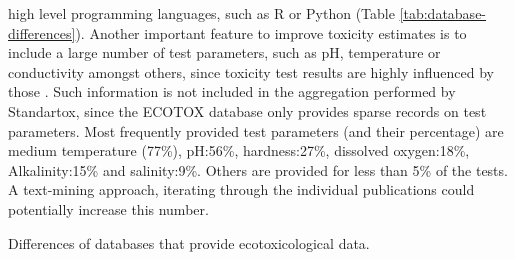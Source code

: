 high level programming languages, such as R or Python \citep{pythoncoreteam_python_2020} (Table \ref{tab:database-differences}). Another important feature to improve toxicity estimates is to include a large number of test parameters, such as pH, temperature or conductivity amongst others, since toxicity test results are highly influenced by those \citep{rosenkrantz_influence_2013, li_temperature_2011}. Such information is not included in the aggregation performed by Standartox, since the ECOTOX database only provides sparse records on test parameters. Most frequently provided test parameters (and their percentage) are medium temperature (77\%), pH:56\%, hardness:27\%, dissolved oxygen:18\%, Alkalinity:15\% and salinity:9\%. Others are provided for less than 5\% of the tests. A text-mining approach, iterating through the individual publications could potentially increase this number.

\begin{table}
    
    \caption{Differences of databases that provide ecotoxicological data.}
    \label{tab:database-differences}
\end{table}






